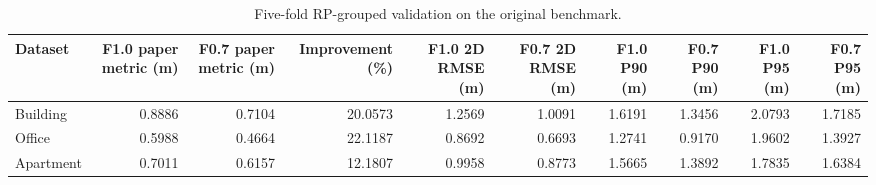 \begin{table}
\caption{Five-fold RP-grouped validation on the original benchmark.}
\label{tab:grouped_cv}
\begin{tabular}{lrrrrrrrrr}
\toprule
Dataset & F1.0 paper metric (m) & F0.7 paper metric (m) & Improvement (\%) & F1.0 2D RMSE (m) & F0.7 2D RMSE (m) & F1.0 P90 (m) & F0.7 P90 (m) & F1.0 P95 (m) & F0.7 P95 (m) \\
\midrule
Building & 0.8886 & 0.7104 & 20.0573 & 1.2569 & 1.0091 & 1.6191 & 1.3456 & 2.0793 & 1.7185 \\
Office & 0.5988 & 0.4664 & 22.1187 & 0.8692 & 0.6693 & 1.2741 & 0.9170 & 1.9602 & 1.3927 \\
Apartment & 0.7011 & 0.6157 & 12.1807 & 0.9958 & 0.8773 & 1.5665 & 1.3892 & 1.7835 & 1.6384 \\
\bottomrule
\end{tabular}
\end{table}
